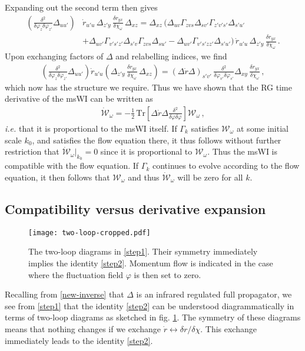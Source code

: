 \documentclass[11pt,draft]{book} %
\begin{document}
Expanding out the second term then gives
\begin{align}
\label{step1}
	\left(\frac{\delta^2}{\delta\varphi_z\delta\varphi_{z'}}\Delta_{uu'}\right)
	&\dot r_{u'u} \, \Delta_{z'y} \, \frac{\delta r_{yx}}{\delta\chi_\omega} \, \Delta_{xz}
  = \Delta_{xz} \, \bigg(\Delta_{uv}\Gamma_{zvs}\Delta_{sv'}\Gamma_{z'v's'}\Delta_{s'u'} \nonumber\\
  &+\Delta_{uv'}\Gamma_{v's'z'}\Delta_{s'v}\Gamma_{zvs}\Delta_{su'}
	-\Delta_{uv'}\Gamma_{v's'zz'}\Delta_{s'u'}\bigg) \,
	\dot r_{u'u} \, \Delta_{z'y} \, \frac{\delta r_{yx}}{\delta\chi_\omega} \,.
\end{align}
Upon exchanging factors of $\Delta$ and relabelling indices, we find
\begin{align}
\label{step2}
	\left(\frac{\delta^2}{\delta\varphi_{z}\delta\varphi_{z'}}\Delta_{uu'}\right)
	\dot r_{u'u}\left(\Delta_{z'y} \, \frac{\delta r_{yx}}{\delta\chi_{\omega}} \, \Delta_{xz}\right)=
	(\Delta\dot r\Delta)_{s'v'} \, \frac{\delta^2}{\delta\varphi_{v'}\delta\varphi_{s'}}
	\Delta_{xy} \, \frac{\delta r_{yx}}{\delta\chi_{\omega}} \,,
\end{align}
which now has the structure we require.
Thus we have shown that the RG time derivative of the msWI can be written as
\begin{align}
	\mathcal{\dot W}_{\omega}=-\frac{1}{2} \, \mathrm{Tr}
	\left[\Delta \dot r\Delta\frac{\delta^2}{\delta\varphi\delta\varphi}\right]\mathcal{W}_{\omega} \,,
\end{align}
\emph{i.e.} that it is proportional to the msWI itself.
If $\Gamma_{k}$ satisfies $\mathcal{W_\omega}$ at some initial scale $k_0$,
and satisfies the flow equation there, it thus follows without further restriction that
$\mathcal{\dot W_\omega}|_{k_{0}}=0$ since it is proportional to $\mathcal{W_\omega}$.
Thus the msWI is compatible with the flow equation.
If $\Gamma_{k}$ continues to evolve according to the flow equation,
it then follows that $\mathcal{W_\omega}$ and thus $\mathcal{\dot W_\omega}$ will be zero for all $k$.


\subsection{Compatibility versus derivative expansion}
\label{sec:exact-vs-derivatives}

\begin{figure}
  \centering
  \texttt{[image: two-loop-cropped.pdf]}
  \caption{The two-loop diagrams in \eqref{step1}.
    Their symmetry immediately implies the identity \eqref{step2}.
  Momentum flow is indicated in the case where the fluctuation field $\varphi$ is then set to zero.}
  \label{fig:two-loop}
\end{figure}
Recalling from \eqref{new-inverse} that $\Delta$ is an infrared regulated full propagator,
we see from \eqref{step1} that the identity \eqref{step2} can be understood diagrammatically
in terms of two-loop diagrams as sketched in fig. \ref{fig:two-loop}.
The symmetry of these diagrams means that nothing changes if we
exchange $\dot{r}\leftrightarrow\delta r/\delta\chi$.
This exchange immediately leads to the identity \eqref{step2}.
\end{document}
